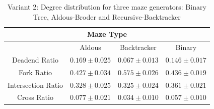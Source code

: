      \begin{table}[!h]
        \begin{center} 
            \caption{Variant 2: Degree distribution for three maze generators: Binary Tree, Aldous-Broder and Recursive-Backtracker} 
        \begin{tabular}{ c c c c} 
        \multicolumn{5}{c}{Maze Type} \\
        \hline
        &Aldous&Backtracker&Binary\\
        \hline
    Deadend Ratio&$0.169\pm 0.025$&$0.067\pm 0.013$&$0.146\pm 0.017$\\    
        \hline
    Fork Ratio&$0.427\pm 0.034$&$0.575\pm 0.026$&$0.436\pm 0.019$\\ 
        \hline
    Intersection Ratio&$0.328\pm 0.025$&$0.325\pm 0.024$&$0.361\pm 0.021$\\   
        \hline
    Cross Ratio&$0.077\pm 0.021$&$0.034\pm 0.010$&$0.057\pm 0.010$\\   
        \hline   
         \end{tabular} 
        \end{center}
         \end{table}
